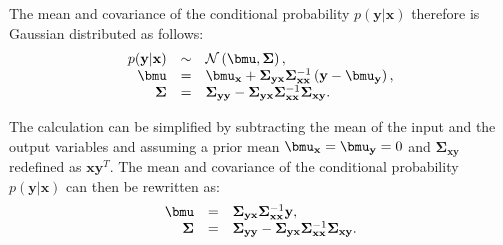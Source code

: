\documentclass[useAMS,usenatbib,fleqn]{mn2e}
\begin{document}
The mean and covariance of the conditional probability $p(\mathbf{y}|\mathbf{x})$ therefore is Gaussian distributed as follows:
\begin{equation}
\begin{array}{rcl}
p(\mathbf{y}|\mathbf{x})		&	\sim		&	\mathcal{N} \left ( \bmu, \mathbf\Sigma \right ),\\
\bmu			&	=		&	\bmu_{\mathbf{x}}+\mathbf\Sigma_{\mathbf{y}\mathbf{x}}\mathbf\Sigma_{\mathbf{x}\mathbf{x}}^{-1}\left ( \mathbf{y}-\bmu_{\mathbf{y}}\right ),\\
\mathbf\Sigma		&	=		&	\mathbf\Sigma_{\mathbf{y}\mathbf{y}}-\mathbf\Sigma_{\mathbf{y}\mathbf{x}}\mathbf\Sigma_{\mathbf{x}\mathbf{x}}^{-1}\mathbf\Sigma_{\mathbf{x}\mathbf{y}}.
\end{array}
\label{eq-conditional-distribution}
\end{equation}

The calculation can be simplified by subtracting the mean of the input and the output variables and assuming a prior mean $\bmu_{\mathbf{x}}=\bmu_{\mathbf{y}}=0$ and $\mathbf\Sigma_{\mathbf{x}\mathbf{y}}$ redefined as $\mathbf{x}\mathbf{y}^{T}$. The mean and covariance of the conditional probability $p(\mathbf{y}|\mathbf{x})$ can then be rewritten as:
\begin{equation}
\label{eq-conditional-zero-mean}
\begin{array}{rcl}
\bmu 		&=&		\mathbf\Sigma_{\mathbf{y}\mathbf{\mathbf{x}}}\mathbf\Sigma_{\mathbf{x}\mathbf{x}}^{-1}\mathbf{y},\\
\mathbf\Sigma 	&=& 	\mathbf\Sigma_{\mathbf{y}\mathbf{y}}-\mathbf\Sigma_{\mathbf{y}\mathbf{x}}\mathbf\Sigma_{\mathbf{x}\mathbf{x}}^{-1}\mathbf\Sigma_{\mathbf{x}\mathbf{y}}.
\end{array}
\end{equation}
\end{document}
